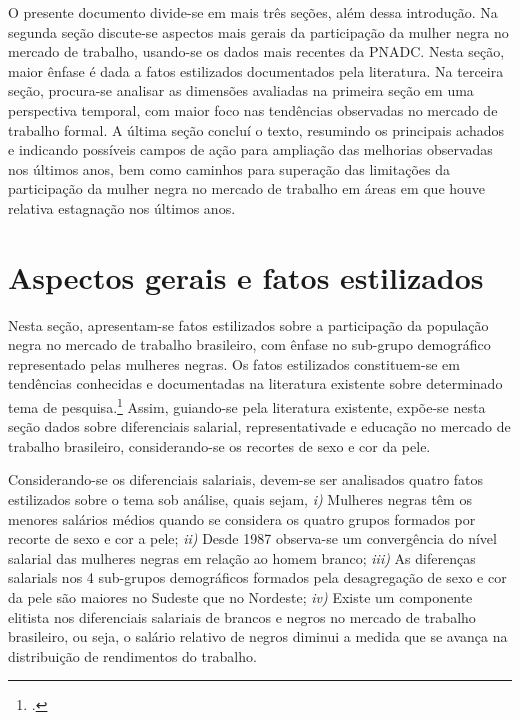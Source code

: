 \documentclass[12pt]{article}
\begin{document}
\par O presente documento divide-se em mais três seções, além dessa introdução. Na segunda seção discute-se aspectos mais gerais da participação da mulher negra no mercado de trabalho, usando-se os dados mais recentes da PNADC. Nesta seção, maior ênfase é dada a fatos estilizados documentados pela literatura. Na terceira seção, procura-se analisar as dimensões avaliadas na primeira seção em uma perspectiva temporal, com maior foco nas tendências observadas no mercado de trabalho formal. A última seção concluí o texto, resumindo os principais achados e indicando possíveis campos de ação para ampliação das melhorias observadas nos últimos anos, bem como caminhos para superação das limitações da participação da mulher negra no mercado de trabalho em áreas em que houve relativa estagnação nos últimos anos.

\section{Aspectos gerais e fatos estilizados} \label{overview}

\par Nesta seção, apresentam-se fatos estilizados sobre a participação da população negra no mercado de trabalho brasileiro, com ênfase no sub-grupo demográfico representado pelas mulheres negras. Os fatos estilizados constituem-se em tendências conhecidas e documentadas na literatura existente sobre determinado tema de pesquisa.\footcite[178]{kaldor1961capital} Assim, guiando-se pela literatura existente, expõe-se nesta seção dados sobre diferenciais salarial, representativade e educação no mercado de trabalho brasileiro, considerando-se os recortes de sexo e cor da pele.

\par Considerando-se os diferenciais salariais, devem-se ser analisados quatro fatos estilizados sobre o tema sob análise, quais sejam, \textit{i)} Mulheres negras têm os menores salários médios quando se considera os quatro grupos formados por recorte de sexo e cor a pele; \textit{ii)} Desde 1987 observa-se um convergência do nível salarial das mulheres negras em relação ao homem branco; \textit{iii)} As diferenças salarials nos 4 sub-grupos de\-mo\-grá\-fi\-cos formados pela desagregação de sexo e cor da pele são maiores no Sudeste que no Nordeste; \textit{iv)} Existe um componente elitista nos diferenciais salariais de brancos e negros no mercado de trabalho brasileiro, ou seja, o salário relativo de negros diminui a medida que se avança na distribuição de rendimentos do trabalho.
\end{document}
